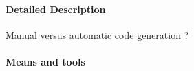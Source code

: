 \paragraph{Detailed Description}
\label{sec:code-deta-descr}
\begin{issue}
Manual versus automatic code generation ?
\end{issue}


\paragraph{Means and tools}
\label{sec:code-means}



\begin{comment}
Shall be replaced by automatic code generation from formal models using
refinement techniques.
\end{comment}




